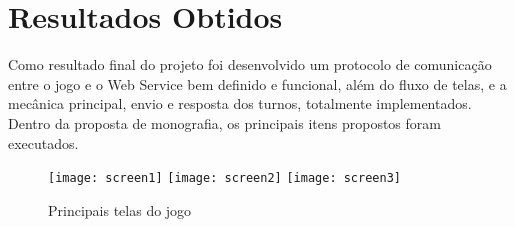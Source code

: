 \chapter{Resultados Obtidos}
\label{cap:resultados_obtidos}

	Como resultado final do projeto foi desenvolvido um protocolo de comunicação entre o jogo 
e o Web Service bem definido e funcional, além do fluxo de telas, e a mecânica principal, envio 
e resposta dos turnos, totalmente implementados. Dentro da proposta de monografia, os principais itens propostos
foram executados. 

\begin{figure}[!h]
  \centering
  \texttt{[image: screen1]} 
  \texttt{[image: screen2]} 
  \texttt{[image: screen3]} 
  \caption{Principais telas do jogo}
\end{figure}